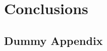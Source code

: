 \documentclass[nofilelist]{cslthse-msc}
\begin{document}




\chapter{Conclusions}


{}

\begin{appendices}
\chapter{Dummy Appendix}






\printfilelist

\checkoddpage
\ifoddpage
\else
   \newpage
   \thispagestyle{empty}
   \mbox{ }
\fi

\end{appendices}
\end{document}
